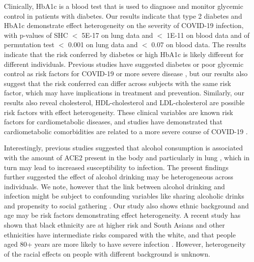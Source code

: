     Clinically, HbA1c is a blood test that is used to diagnose and monitor glycemic control in patients with diabetes. Our results indicate that type 2 diabetes and HbA1c demonstrate effect heterogeneity on the severity of COVID-19 infection, with p-values of SHC  $<$ 5E-17 on lung data and $<$ 1E-11 on blood data and of permutation test $<$ 0.001 on lung data and $<$ 0.07 on blood data. The results indicate that the risk conferred by diabetes or high HbA1c is likely different for different individuals. Previous studies have suggested diabetes or poor glycemic  control as risk factors for COVID-19 or more severe disease \cite{mehra2020cardiovascular,fang2020patients,zhu2020association}, but our results also suggest that the risk conferred can differ across subjects with the same risk factor, which may have implications in treatment and prevention. Similarly, our results also reveal cholesterol, HDL-cholesterol and LDL-cholesterol are possible risk factors with effect heterogeneity. These clinical variables are known risk factors for cardiometabolic diseases, and studies have demonstrated that cardiometabolic comorbidities are related to a more severe course of COVID-19 \cite{stefan2020obesity,guo2020cardiovascular,shi2020association}.
    
    Interestingly, previous studies suggested that alcohol consumption is associated with the amount of ACE2 present in the body and particularly in lung \cite{okuno1986mild,testino2020patients}, which in turn may lead to increased susceptibility to infection. The present findings further suggested the effect of alcohol drinking may be heterogeneous across individuals. We note, however that the link between alcohol drinking and infection might be subject to confounding variables like sharing alcoholic drinks \cite{mungmungpuntipantip2020sharing} and propensity to social gathering \cite{andersen2020early}. Our study also shows ethnic background and age may be risk factors demonstrating effect heterogeneity. A recent study has shown that black ethnicity are at higher risk and South Asians and other ethnicities have intermediate risks compared with the white, and that people aged 80+ years are more likely to have severe infection \cite{atkins2020preexisting}. However, heterogeneity of the racial effects on people with different background is unknown. 


